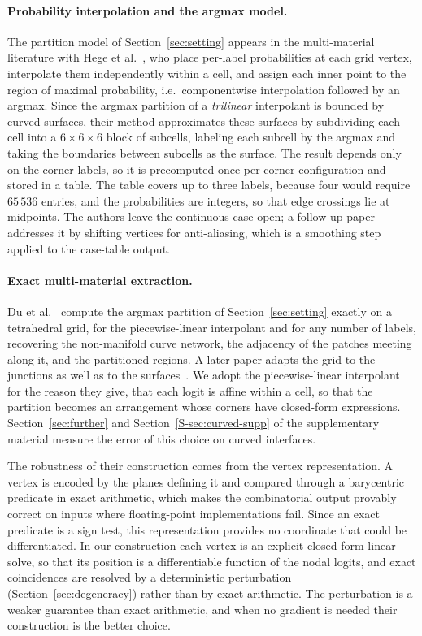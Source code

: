 \documentclass{egpubl}
\newcommand{\sref}[1]{\ref*{S-#1}}
\newcommand{\supp}[1]{Section~\sref{#1} of the supplementary material}
\theoremstyle{definition}
\begin{document}
\paragraph{Probability interpolation and the argmax model.} The partition
model of Section~\ref{sec:setting} appears in the multi-material literature
with Hege et al.~\cite{hege1997}, who place per-label probabilities at each
grid vertex, interpolate them independently within a cell, and assign each
inner point to the region of maximal probability, i.e.\ componentwise
interpolation followed by an argmax. Since the argmax partition
of a \emph{trilinear} interpolant is bounded by curved surfaces, their method
approximates these surfaces by subdividing each cell into a $6\times6\times6$
block of subcells, labeling each subcell by the argmax and taking the
boundaries between subcells as the surface. The result depends only on the
corner labels, so it is precomputed once per corner configuration and stored
in a table. The table covers up to three
labels, because four would require $65\,536$ entries, and the probabilities
are integers, so that edge crossings lie at midpoints. The authors leave the
continuous case open; a follow-up paper~\cite{stalling1998} addresses it by
shifting vertices for anti-aliasing, which is a smoothing step applied to the
case-table output.

\paragraph{Exact multi-material extraction.} Du et al.~\cite{du2022} compute
the argmax partition of Section~\ref{sec:setting} exactly on a tetrahedral grid,
for the piecewise-linear interpolant and for any number of labels, recovering
the non-manifold curve network, the adjacency of the patches meeting along it,
and the partitioned regions. A later paper adapts the grid to the junctions as
well as to the surfaces~\cite{ju2024}. We adopt the piecewise-linear
interpolant for the reason they give, that each logit is affine within a
cell, so that the partition becomes an arrangement whose corners have
closed-form expressions. Section~\ref{sec:further} and \supp{sec:curved-supp}
measure the error of this choice on curved interfaces.

The robustness of their construction comes from the vertex representation. A
vertex is encoded by the planes defining it and compared through a barycentric
predicate in exact arithmetic, which makes the combinatorial output provably
correct on inputs where floating-point implementations fail. Since an exact
predicate is a sign test, this representation provides no coordinate that
could be differentiated. In our construction each
vertex is an explicit closed-form linear solve, so that its position is a
differentiable function of the nodal logits, and exact coincidences are
resolved by a deterministic perturbation (Section~\ref{sec:degeneracy})
rather than by exact arithmetic. The perturbation is a weaker guarantee than
exact arithmetic, and when no gradient is needed their construction is the
better choice.
\end{document}
